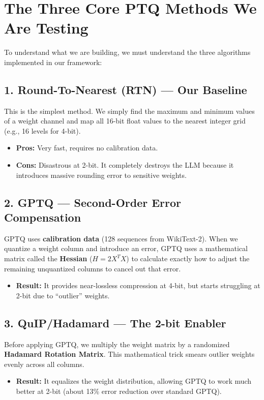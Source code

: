 \documentclass[12pt, a4paper]{article}
\begin{document}
\section{The Three Core PTQ Methods We Are Testing}
To understand what we are building, we must understand the three algorithms implemented in our framework:

\subsection{1. Round-To-Nearest (RTN) --- Our Baseline}
This is the simplest method. We simply find the maximum and minimum values of a weight channel and map all 16-bit float values to the nearest integer grid (e.g., 16 levels for 4-bit). 
\begin{itemize}
    \item \textbf{Pros:} Very fast, requires no calibration data.
    \item \textbf{Cons:} Disastrous at 2-bit. It completely destroys the LLM because it introduces massive rounding error to sensitive weights.
\end{itemize}

\subsection{2. GPTQ --- Second-Order Error Compensation}
GPTQ uses \textbf{calibration data} (128 sequences from WikiText-2). When we quantize a weight column and introduce an error, GPTQ uses a mathematical matrix called the \textbf{Hessian} ($H = 2 X^T X$) to calculate exactly how to adjust the remaining unquantized columns to cancel out that error.
\begin{itemize}
    \item \textbf{Result:} It provides near-lossless compression at 4-bit, but starts struggling at 2-bit due to ``outlier'' weights.
\end{itemize}

\subsection{3. QuIP/Hadamard --- The 2-bit Enabler}
Before applying GPTQ, we multiply the weight matrix by a randomized \textbf{Hadamard Rotation Matrix}. This mathematical trick smears outlier weights evenly across all columns. 
\begin{itemize}
    \item \textbf{Result:} It equalizes the weight distribution, allowing GPTQ to work much better at 2-bit (about 13\% error reduction over standard GPTQ).
\end{itemize}
\end{document}
